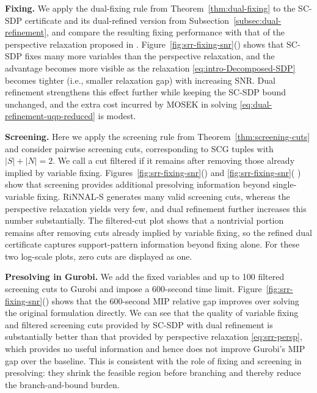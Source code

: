 \documentclass[11pt]{article}
\theoremstyle{plain}
\begin{document}
\medskip
\noindent\textbf{Fixing.}
We apply the dual-fixing rule from Theorem~\ref{thm:dual-fixing} to the SC-SDP certificate and its dual-refined version from Subsection~\ref{subsec:dual-refinement}, and compare the resulting fixing performance with that of the perspective relaxation proposed in \cite{atamturk2020safe}.
Figure~\ref{fig:srr-fixing-snr}() shows that SC-SDP fixes many more variables than the perspective relaxation, and the advantage becomes more visible as the 
relaxation \eqref{eq:intro-Decomposed-SDP} becomes tighter (i.e., smaller relaxation gap)
with increasing SNR. Dual refinement strengthens this effect further while keeping the SC-SDP bound unchanged, and the extra cost 
incurred by MOSEK in solving 
\eqref{eq:dual-refinement-uqp-reduced} is modest.

\medskip
\noindent\textbf{Screening.}
Here we apply the screening rule from Theorem~\ref{thm:screening-cuts} and consider pairwise screening cuts, corresponding to SCG tuples with $|S|+|N|=2$. We call a cut filtered if it remains after removing those already implied by variable fixing. Figures~\ref{fig:srr-fixing-snr}() and \ref{fig:srr-fixing-snr}(
) show that screening provides additional presolving information beyond single-variable fixing. RiNNAL-S generates many valid screening cuts, whereas the perspective relaxation yields very few, and dual refinement further increases this number substantially. The filtered-cut plot shows that a nontrivial portion remains after removing cuts already implied by variable fixing, so the refined dual certificate captures support-pattern information beyond fixing alone. For these two log-scale plots, zero cuts are displayed as one.

\medskip
\noindent\textbf{Presolving in Gurobi.}
We add the fixed variables and up to 100 filtered screening cuts to Gurobi and impose a 600-second time limit. Figure~\ref{fig:srr-fixing-snr}() shows that the 600-second MIP relative gap improves over solving the original formulation directly. 
We can see that the quality of variable fixing and filtered screening cuts provided by SC-SDP with dual refinement is substantially better than that provided by perspective relaxation \eqref{eq:srr-persp}, which provides no useful information and hence does not
improve Gurobi's MIP gap over the baseline.
This is consistent with the role of fixing and screening in presolving: they shrink the feasible region before branching and thereby reduce the branch-and-bound burden.
\end{document}
